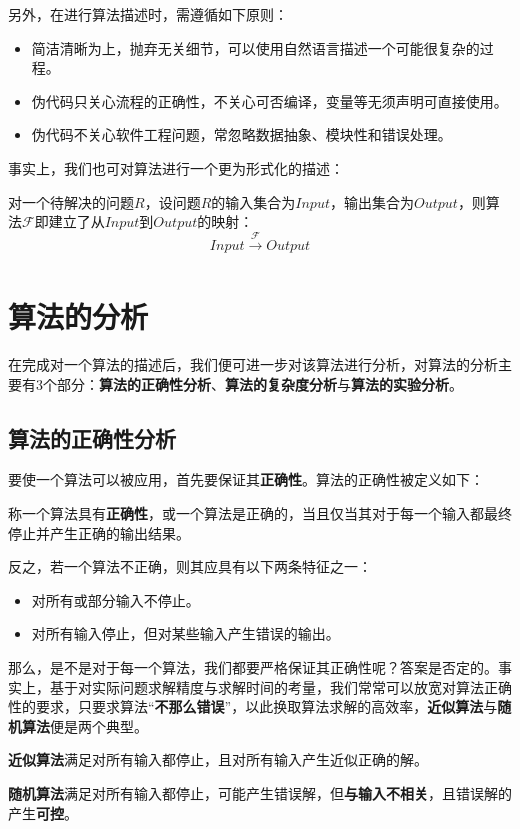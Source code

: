\documentclass[12pt,a4paper,violet]{bbe}
\begin{document}
另外，在进行算法描述时，需遵循如下原则：
\begin{itemize}
	\item 简洁清晰为上，抛弃无关细节，可以使用自然语言描述一个可能很复杂的过程。
	\item 伪代码只关心流程的正确性，不关心可否编译，变量等无须声明可直接使用。
	\item 伪代码不关心软件工程问题，常忽略数据抽象、模块性和错误处理。
\end{itemize}

事实上，我们也可对算法进行一个更为形式化的描述：
\begin{definition}
	对一个待解决的问题$R$，设问题$R$的输入集合为$Input$，输出集合为$Output$，则算法$\mathscr{F}$即建立了从$Input$到$Output$的映射：
	$$
	Input\xrightarrow[]{\mathscr{F}}Output
	$$
\end{definition}
\section{算法的分析}
在完成对一个算法的描述后，我们便可进一步对该算法进行分析，对算法的分析主要有3个部分：\textbf{算法的正确性分析}、\textbf{算法的复杂度分析}与\textbf{算法的实验分析}。
\subsection{算法的正确性分析}
要使一个算法可以被应用，首先要保证其\textbf{正确性}。算法的正确性被定义如下：
\begin{definition}
	称一个算法具有\textbf{正确性}，或一个算法是正确的，当且仅当其对于每一个输入都最终停止并产生正确的输出结果。
\end{definition}

反之，若一个算法不正确，则其应具有以下两条特征之一：
\begin{itemize}
	\item 对所有或部分输入不停止。
	\item 对所有输入停止，但对某些输入产生错误的输出。
\end{itemize}

那么，是不是对于每一个算法，我们都要严格保证其正确性呢？答案是否定的。事实上，基于对实际问题求解精度与求解时间的考量，我们常常可以放宽对算法正确性的要求，只要求算法“\textbf{不那么错误}”，以此换取算法求解的高效率，\textbf{近似算法}与\textbf{随机算法}便是两个典型。
\begin{definition}
 \textbf{近似算法}满足对所有输入都停止，且对所有输入产生近似正确的解。

\end{definition}
\begin{definition}
	\textbf{随机算法}满足对所有输入都停止，可能产生错误解，但\textbf{与输入不相关}，且错误解的产生\textbf{可控}。
\end{definition}
\end{document}
